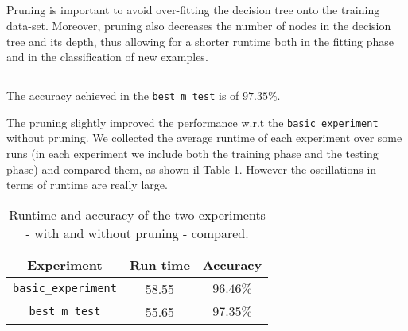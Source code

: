 \subsection{}
Pruning is important to avoid over-fitting the decision tree onto the training data-set. Moreover, pruning also decreases the number of nodes in the decision tree and its depth, thus allowing for a shorter runtime both in the fitting phase and in the classification of new examples.

\setcounter{subsection}{3}
\subsection{}
The accuracy achieved in the \verb*!best_m_test! is of $ 97.35\% $.

The pruning slightly improved the performance w.r.t the \verb*!basic_experiment! without pruning. We collected the average runtime of each experiment over some runs (in each experiment we include both the training phase and the testing phase) and compared them, as shown il Table \ref{table:runtime}. However the oscillations in terms of runtime are really large.
\begin{table}[h]
    \centering
    \begin{tabular}{c c c}
        \textbf{Experiment} & \textbf{Run time} & \textbf{Accuracy} \\
        \midrule\midrule
        \verb*!basic_experiment! & 58.55 & $ 96.46\% $ \\
        \midrule
        \verb*!best_m_test! & 55.65 & $ 97.35\% $ \\
    \end{tabular}
    \caption{Runtime and accuracy of the two experiments - with and without pruning - compared.}
    \label{table:runtime}
\end{table}
